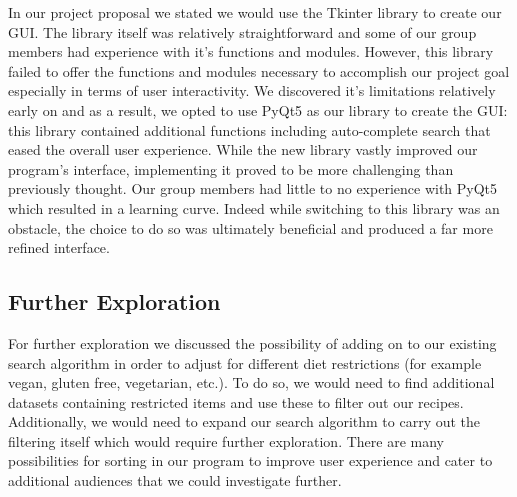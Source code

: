 \documentclass[fontsize=11pt]{article}
\begin{document}
    \label{sec: pyqt5} In our project proposal we stated we would use the Tkinter library to create our GUI. The library itself was relatively straightforward and some of our group members had experience with it's functions and modules. However, this library failed to offer the functions and modules necessary to accomplish our project goal especially in terms of user interactivity. We discovered it's limitations relatively early on and as a result, we opted to use PyQt5 as our library to create the GUI: this library contained additional functions including auto-complete search that eased the overall user experience. While the new library vastly improved our program's interface, implementing it proved to be more challenging than previously thought. Our group members had little to no experience with PyQt5 which resulted in a learning curve. Indeed while switching to this library was an obstacle, the choice to do so was ultimately beneficial and produced a far more refined interface.

    \subsection*{Further Exploration}

    For further exploration we discussed the possibility of adding on to our existing search algorithm in order to adjust for different diet restrictions (for example vegan, gluten free, vegetarian, etc.). To do so, we would need to find additional datasets containing restricted items and use these to filter out our recipes. Additionally, we would need to expand our search algorithm to carry out the filtering itself which would require further exploration. There are many possibilities for sorting in our program to improve user experience and cater to additional audiences that we could investigate further.

\end{document}
